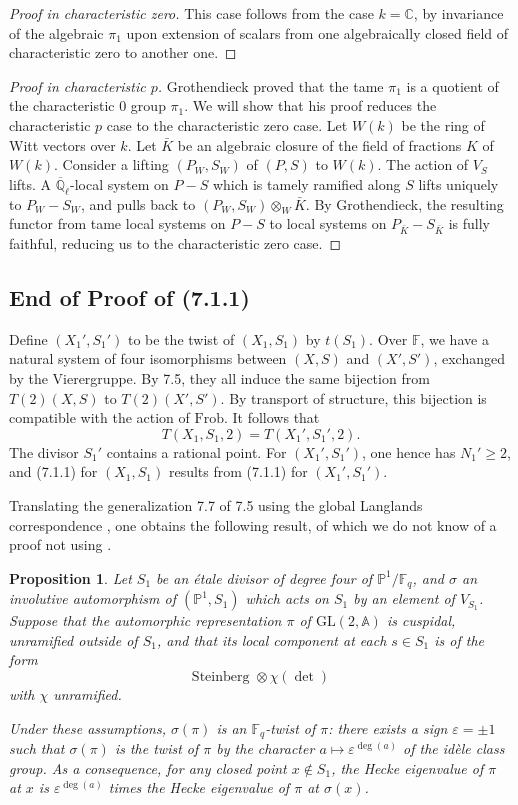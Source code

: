 \documentclass[11pt,a4paper]{article}
\theoremstyle{plain}
\newtheorem{proposition}[theorem]{Proposition}
\theoremstyle{definition}
\newcommand{\Ql}{\overline{\mathbb{Q}}_\ell}
\newcommand{\Fq}{\mathbb{F}_q}
\newcommand{\F}{\mathbb{F}}
\newcommand{\C}{\mathbb{C}}
\newcommand{\GL}{\mathrm{GL}}
\newcommand{\Frob}{\mathrm{Frob}}
\begin{document}
\begin{proof}[Proof in characteristic zero]
This case follows from the case $k = \C$, by invariance of the algebraic $\pi_1$ upon extension of scalars from one algebraically closed field of characteristic zero to another one.
\end{proof}

\begin{proof}[Proof in characteristic $p$]
Grothendieck proved that the tame $\pi_1$ is a quotient of the characteristic $0$ group $\pi_1$. We will show that his proof reduces the characteristic $p$ case to the characteristic zero case. Let $W(k)$ be the ring of Witt vectors over $k$. Let $\bar{K}$ be an algebraic closure of the field of fractions $K$ of $W(k)$. Consider a lifting $(P_W, S_W)$ of $(P,S)$ to $W(k)$. The action of $V_S$ lifts. A $\Ql$-local system on $P - S$ which is tamely ramified along $S$ lifts uniquely to $P_W - S_W$, and pulls back to $(P_W, S_W) \otimes_W \bar{K}$. By Grothendieck, the resulting functor from tame local systems on $P - S$ to local systems on $P_{\bar{K}} - S_{\bar{K}}$ is fully faithful, reducing us to the characteristic zero case.
\end{proof}

\subsection{End of Proof of (7.1.1)}
Define $(X_1', S_1')$ to be the twist of $(X_1, S_1)$ by $t(S_1)$. Over $\F$, we have a natural system of four isomorphisms between $(X,S)$ and $(X', S')$, exchanged by the Vierergruppe. By 7.5, they all induce the same bijection from $T(2)(X,S)$ to $T(2)(X', S')$. By transport of structure, this bijection is compatible with the action of $\Frob$. It follows that
\[
T(X_1, S_1, 2) = T(X_1', S_1', 2).
\]
The divisor $S_1'$ contains a rational point. For $(X_1', S_1')$, one hence has $N_1' \geq 2$, and (7.1.1) for $(X_1, S_1)$ results from (7.1.1) for $(X_1', S_1')$.

Translating the generalization 7.7 of 7.5 using the global Langlands correspondence \cite{L}, one obtains the following result, of which we do not know of a proof not using \cite{L}.

\begin{proposition}
Let $S_1$ be an \'etale divisor of degree four of $\mathbb{P}^1/\Fq$, and $\sigma$ an involutive automorphism of $(\mathbb{P}^1, S_1)$ which acts on $S_1$ by an element of $V_{S_1}$. Suppose that the automorphic representation $\pi$ of $\GL(2, \mathbb{A})$ is cuspidal, unramified outside of $S_1$, and that its local component at each $s \in S_1$ is of the form
\[
\text{Steinberg } \otimes \chi(\det)
\]
with $\chi$ unramified.

Under these assumptions, $\sigma(\pi)$ is an $\Fq$-twist of $\pi$: there exists a sign $\varepsilon = \pm 1$ such that $\sigma(\pi)$ is the twist of $\pi$ by the character $a \mapsto \varepsilon^{\deg(a)}$ of the id\`ele class group. As a consequence, for any closed point $x \notin S_1$, the Hecke eigenvalue of $\pi$ at $x$ is $\varepsilon^{\deg(a)}$ times the Hecke eigenvalue of $\pi$ at $\sigma(x)$.
\end{proposition}
\end{document}
